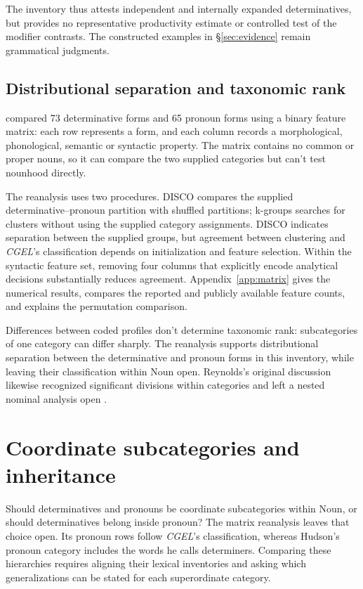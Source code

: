 \documentclass[12pt]{article}
\begin{document}
The inventory thus attests independent and internally expanded determinatives, but provides no representative productivity estimate or controlled test of the modifier contrasts. The constructed examples in §\ref{sec:evidence} remain grammatical judgments.

\subsection{Distributional separation and taxonomic rank}

\textcite{reynolds2021} compared 73 determinative forms and 65 pronoun forms using a binary feature matrix: each row represents a form, and each column records a morphological, phonological, semantic or syntactic property. The matrix contains no common or proper nouns, so it can compare the two supplied categories but can't test nounhood directly.

The reanalysis uses two procedures. DISCO compares the supplied determinative--pronoun partition with shuffled partitions; k-groups searches for clusters without using the supplied category assignments. DISCO indicates separation between the supplied groups, but agreement between clustering and \textit{CGEL}'s classification depends on initialization and feature selection. Within the syntactic feature set, removing four columns that explicitly encode analytical decisions substantially reduces agreement. Appendix~\ref{app:matrix} gives the numerical results, compares the reported and publicly available feature counts, and explains the permutation comparison.

Differences between coded profiles don't determine taxonomic rank: subcategories of one category can differ sharply. The reanalysis supports distributional separation between the determinative and pronoun forms in this inventory, while leaving their classification within Noun open. Reynolds's original discussion likewise recognized significant divisions within categories and left a nested nominal analysis open \citep{reynolds2021}.

\section{Coordinate subcategories and inheritance}\label{sec:inheritance}

Should determinatives and pronouns be coordinate subcategories within Noun, or should determinatives belong inside pronoun? The matrix reanalysis leaves that choice open. Its pronoun rows follow \textit{CGEL}'s classification, whereas Hudson's pronoun category includes the words he calls determiners. Comparing these hierarchies requires aligning their lexical inventories and asking which generalizations can be stated for each superordinate category.
\end{document}
